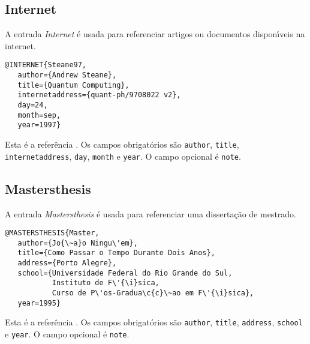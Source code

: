 \documentclass[a4paper,12pt]{article}
\newcommand{\ii}{\'{\i}}
\newcommand{\ca}{\c{c}\~ao}
\newcommand{\enf}{\em}
\begin{document}
\subsection*{Internet}

A entrada {\enf Internet} \'e usada para referenciar artigos ou
documentos dispon{\ii}\-veis na internet.
\begin{verbatim}
@INTERNET{Steane97,
   author={Andrew Steane},
   title={Quantum Computing},
   internetaddress={quant-ph/9708022 v2},
   day=24,
   month=sep,
   year=1997}
\end{verbatim}
Esta \'e a refer\^encia \cite{Steane97}.
Os campos obrigat\'orios s\~ao \verb+author+,
\verb+title+, \verb+interne+\-\verb+taddress+, 
\verb+day+, \verb+month+ e \verb+year+.
O campo opcional \'e \verb+note+.




\begin{comment}
\subsection*{Manual}

A entrada {\enf Manual} \'e usada para referenciar documenta{\ca}
t\'ecnica.
Sua forma geral \'e \cite{}
\begin{verbatim}
\end{verbatim}
\end{comment}



\subsection*{Mastersthesis}

A entrada {\enf Mastersthesis} \'e usada para referenciar uma
disserta{\ca} de mes\-tra\-do.
\begin{verbatim}
@MASTERSTHESIS{Master,
   author={Jo{\~a}o Ningu\'em},
   title={Como Passar o Tempo Durante Dois Anos},
   address={Porto Alegre},
   school={Universidade Federal do Rio Grande do Sul,
           Instituto de F\'{\i}sica,
           Curso de P\'os-Gradua\c{c}\~ao em F\'{\i}sica},
   year=1995}
\end{verbatim}
Esta \'e a refer\^encia \cite{Master}.
Os campos obrigat\'orios s\~ao \verb+author+,
\verb+title+, \verb+address+, \verb+school+ e \verb+year+.
O campo opcional \'e \verb+note+.


\begin{comment}
\subsection*{Misc}

A entrada {\enf Misc} \'e usada para referenciar algo que n\~ao se 
enquadre nos moldes das outras entradas.
Sua forma geral \'e \cite{Misc}
\begin{verbatim}
\end{verbatim}
\end{comment}
\end{document}
